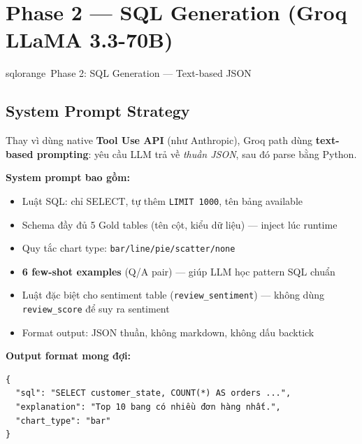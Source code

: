 \documentclass[12pt, a4paper]{article}
\begin{document}
\section{Phase 2 — SQL Generation (Groq LLaMA 3.3-70B)}

\begin{phasebox}{sqlorange}{\faBolt\ Phase 2: SQL Generation — Text-based JSON}

\subsection*{System Prompt Strategy}

Thay vì dùng native \textbf{Tool Use API} (như Anthropic), Groq path dùng
\textbf{text-based prompting}: yêu cầu LLM trả về \textit{thuần JSON},
sau đó parse bằng Python.

\vspace{0.5em}

\textbf{System prompt bao gồm:}
\begin{itemize}[leftmargin=1.5em, itemsep=3pt]
  \item Luật SQL: chỉ SELECT, tự thêm \texttt{LIMIT 1000}, tên bảng available
  \item Schema đầy đủ 5 Gold tables (tên cột, kiểu dữ liệu) — inject lúc runtime
  \item Quy tắc chart type: \texttt{bar/line/pie/scatter/none}
  \item \textbf{6 few-shot examples} (Q/A pair) — giúp LLM học pattern SQL chuẩn
  \item Luật đặc biệt cho sentiment table (\texttt{review\_sentiment}) — không dùng
        \texttt{review\_score} để suy ra sentiment
  \item Format output: JSON thuần, không markdown, không dấu backtick
\end{itemize}

\vspace{0.5em}

\textbf{Output format mong đợi:}
\begin{codebox}[title={JSON output từ LLaMA 3.3-70B}]
\begin{verbatim}
{
  "sql": "SELECT customer_state, COUNT(*) AS orders ...",
  "explanation": "Top 10 bang có nhiều đơn hàng nhất.",
  "chart_type": "bar"
}
\end{verbatim}
\end{codebox}


\end{phasebox}
\end{document}
